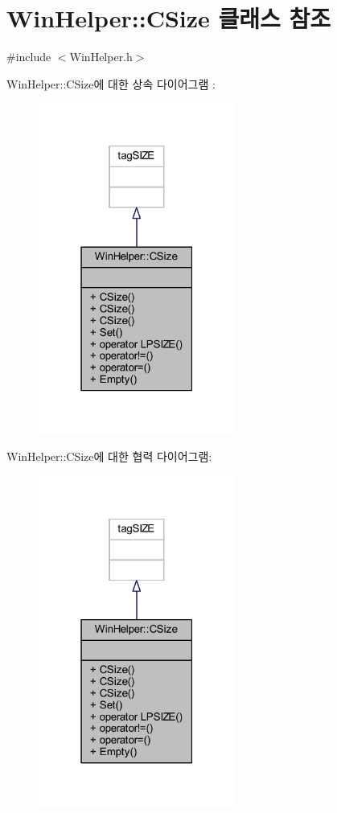 \hypertarget{class_win_helper_1_1_c_size}{}\section{Win\+Helper\+:\+:C\+Size 클래스 참조}
\label{class_win_helper_1_1_c_size}


{\ttfamily \#include $<$Win\+Helper.\+h$>$}



Win\+Helper\+:\+:C\+Size에 대한 상속 다이어그램 \+: \nopagebreak
\begin{figure}[H]
\begin{center}
\leavevmode
\includegraphics[width=183pt]{class_win_helper_1_1_c_size__inherit__graph}
\end{center}
\end{figure}


Win\+Helper\+:\+:C\+Size에 대한 협력 다이어그램\+:\nopagebreak
\begin{figure}[H]
\begin{center}
\leavevmode
\includegraphics[width=183pt]{class_win_helper_1_1_c_size__coll__graph}
\end{center}
\end{figure}
